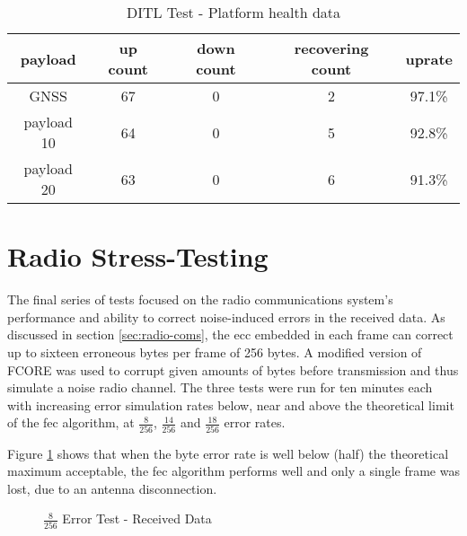 \begin{table}[H]
\begin{center}
\begin{tabular}{ |c|c c c c| }
\hline
payload & up count & down count & recovering count & uprate \\
\hline
GNSS       & 67 & 0 & 2 & 97.1\% \\
payload 10 & 64 & 0 & 5 & 92.8\% \\
payload 20 & 63 & 0 & 6 & 91.3\% \\
\hline 
\end{tabular}
\end{center}
\caption {DITL Test - Platform health data}
\label{tab:ditl-health}
\end{table}

\section{Radio Stress-Testing}

The final series of tests focused on the radio communications system's
performance and ability to correct noise-induced errors in the received data.
As discussed in section \ref{sec:radio-coms}, the \acrfull{ecc} embedded in
each frame can correct up to sixteen erroneous bytes per frame of 256 bytes.
A modified version of FCORE was used to corrupt given amounts of bytes before
transmission and thus simulate a noise radio channel. The three tests were run
for ten minutes each with increasing error simulation rates below, near and
above the theoretical limit of the \acrshort{fec} algorithm, at $\frac{8}{256}$,
$\frac{14}{256}$ and $\frac{18}{256}$ error rates.

Figure \ref{fig:stress-8.256} shows that when the byte error rate is well below
(half) the theoretical maximum acceptable, the \acrshort{fec} algorithm performs
well and only a single frame was lost, due to an antenna disconnection.

\begin{figure}[H]
\centering
\caption{$\frac{8}{256}$ Error Test - Received Data}
\label{fig:stress-8.256}
\end{figure}

